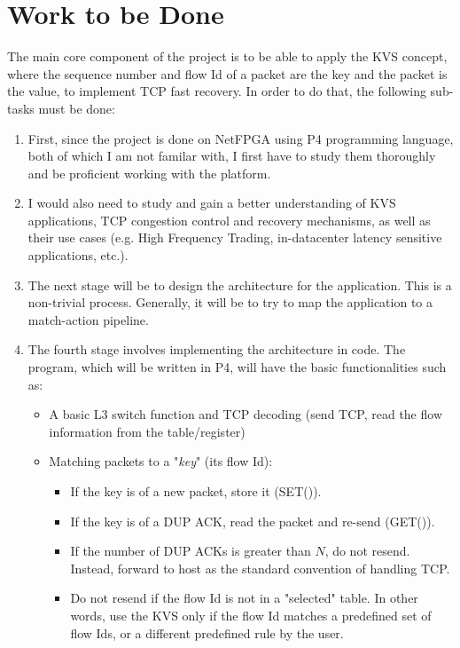 \section*{\fontsize{18pt}{1}\selectfont Work to be Done}

The main core component of the project is to be able to apply the KVS concept, where the sequence number and flow Id of a packet are the key and the packet is the value, to implement TCP fast recovery. In order to do that, the following sub-tasks must be done:

\begin{enumerate}
	
	\item First, since the project is done on NetFPGA using P4 programming language, both of which I am not familar with, I first have to study them thoroughly and be proficient working with the platform.
	
	\item I would also need to study and gain a better understanding of KVS applications, TCP congestion control and recovery mechanisms, as well as their use cases (e.g. High Frequency Trading, in-datacenter latency sensitive applications, etc.).
	
	\item The next stage will be to design the architecture for the application. This is a non-trivial process. Generally, it will be to try to map the application to a match-action pipeline.
	
	\item The fourth stage involves implementing the architecture in code. The program, which will be written in P4, will have the basic functionalities such as:
	\begin{itemize}
		\item A basic L3 switch function and TCP decoding (send TCP, read the flow information from the table/register)
		
		\item Matching packets to a "\emph{key}" (its flow Id):
			\begin{itemize}
				\item If the key is of a new packet, store it (SET()).
				\item If the key is of a DUP ACK, read the packet and re-send (GET()).
				\item If the number of DUP ACKs is greater than $N$, do not resend. Instead, forward to host as the standard convention of handling TCP.
				\item Do not resend if the flow Id is not in a "selected" table. In other words, use the KVS only if the flow Id matches a predefined set of flow Ids, or a different predefined rule by the user.
			\end{itemize}		
	

\end{itemize}
\end{enumerate}
